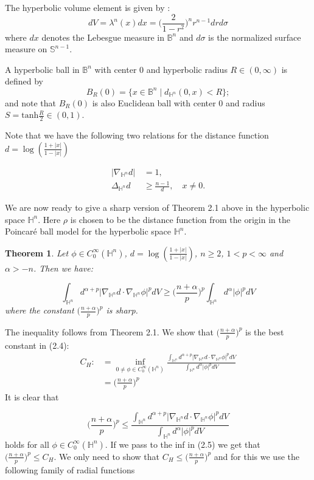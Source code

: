 \documentclass[12pt]{amsart}
\numberwithin{equation}{section}
\newtheorem{theorem}{Theorem}
\numberwithin{theorem}{section}
\numberwithin{theorem}{section} \numberwithin{lemma}{section}
\numberwithin{definition}{section}
\numberwithin{corollary}{section}
\numberwithin{remark}{section}
\numberwithin{proposition}{section}
\begin{document}
The hyperbolic volume element is given by :
\[dV=\lambda^n(x) dx=\Big(\frac{2}{1-r^2}\Big)^nr^{n-1}drd\sigma\]  where $dx$ denotes the  Lebesgue measure in $\mathbb{B}^n$ and $d\sigma$ is the normalized surface measure on $\mathbb{S}^{n-1}$.

A hyperbolic ball in $\mathbb{B}^n$ with center $0$ and hyperbolic
radius $R\in (0, \infty )$ is defined by
\[B_R(0)=\{x\in\mathbb{B}^n \mid d_{\mathbb{H}^n}(0,x)<R\};\]
and note that  $B_R(0)$ is also Euclidean ball with center $0$ and
radius $ S=\text{tanh}\frac{R}{2}\in (0,1)$.

Note that we have the following two relations for the distance
function $d= \log (\frac{1+|x|}{1-|x|})$

\[\begin{aligned}
 |\nabla_{\mathbb{H}^n}d|\, &=1,\\
 \Delta_{\mathbb{H}^n} d\, &\ge
\frac{n-1}{d}, \quad x \neq 0.\end{aligned}\]
\medskip

We are now ready to give a sharp version of Theorem 2.1 above in the
hyperbolic space $\mathbb{H}^n$. Here  $\rho$ is chosen to be the
distance function from the origin in the Poincar\'e ball model for
the hyperbolic space $\mathbb{H}^n$.
\begin{theorem} Let $\phi\in C_0^{\infty}(\mathbb{H}^n)$, $d=\log(\frac{1+|x|}{1-|x|})$, $n\ge 2$, $1<p<\infty$ and
$\alpha>-n$. Then we have:

\begin{equation}\int_{\mathbb{H}^n} d^{\alpha+p}|\nabla_{\mathbb{H}^n} d\cdot \nabla_{\mathbb{H}^n}\phi|^p dV \ge \Big(\frac{n+\alpha}{p}\Big)^p \int_{\mathbb{H}^n}
d^{\alpha}|\phi|^pdV\end{equation} where the constant  $
\big(\frac{n+\alpha}{p}\big)^p$ is sharp.
\end{theorem}
\proof
 The inequality follows from Theorem 2.1. We
 show that
$\big(\frac{n+\alpha}{p}\big)^p$ is the best constant in (2.4):
\[\begin{aligned}C_H:&=\inf_{0\neq\phi\in C_0^{\infty}(\mathbb{H}^n)}\frac{ \int_{\mathbb{H}^n}
d^{\alpha+p}|\nabla_{\mathbb{H}^n}d\cdot
\nabla_{\mathbb{H}^n}\phi|^p dV} {
\int_{\mathbb{H}^n} d^{\alpha}|\phi|^pdV}\\
&=\Big(\frac{n+\alpha}{p}\Big)^p\end{aligned}\]
 It is
clear that

\begin{equation}
\big(\frac{n+\alpha}{p}\big)^p\le\frac{ \int_{\mathbb{H}^n}
d^{\alpha+p}|\nabla_{\mathbb{H}^n}d\cdot
\nabla_{\mathbb{H}^n}\phi|^pdV} { \int_{\mathbb{H}^n}
d^{\alpha}|\phi|^pdV}
\end{equation}
holds for all $\phi\in C_0^{\infty}(\mathbb{H}^n)$. If we pass to
the inf in (2.5) we get that $\big(\frac{n+\alpha}{p}\big)^p\le
C_H$. We only need to show that
$C_H\le\big(\frac{n+\alpha}{p}\big)^p$ and for this we use the
following family of radial functions
\end{document}
